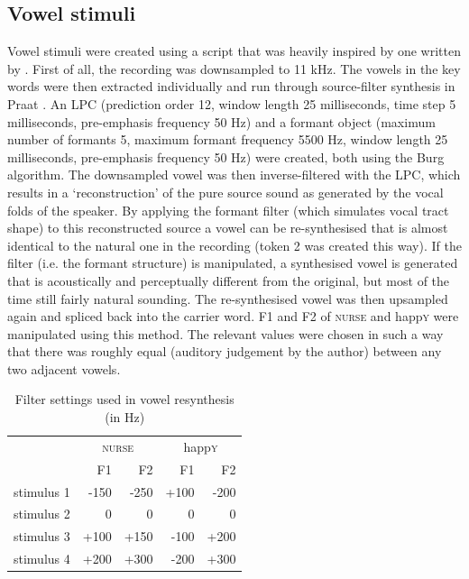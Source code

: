 \subsection{Vowel stimuli}\label{sec.perc_method.vow}

Vowel stimuli were created using a script that was heavily inspired by one written by \textcite{styler2008}.
First of all, the recording was downsampled to 11 kHz.
The vowels in the key words were then extracted individually and run through source-filter synthesis in Praat \parencite{praat}.
An LPC (prediction order 12, window length 25 milliseconds, time step 5 milliseconds, pre-emphasis frequency 50 Hz) and a formant object (maximum number of formants 5, maximum formant frequency 5500 Hz, window length 25 milliseconds, pre-emphasis frequency 50 Hz) were created, both using the Burg algorithm.
The downsampled vowel was then inverse-filtered with the LPC, which results in a `reconstruction' of the pure source sound as generated by the vocal folds of the speaker.
By applying the formant filter (which simulates vocal tract shape) to this reconstructed source a vowel can be re-synthesised that is almost identical to the natural one in the recording (token 2 was created this way).
If the filter (i.e. the formant structure) is manipulated, a synthesised vowel is generated that is acoustically and perceptually different from the original, but most of the time still fairly natural sounding.
The re-synthesised vowel was then upsampled again and spliced back into the carrier word.
F1 and F2 of \textsc{nurse} and happ\textsc{y} were manipulated using this method.
The relevant values were chosen in such a way that there was roughly equal  (auditory judgement by the author) between any two adjacent vowels.

\begin{table}[h]
	\caption{Filter settings used in vowel resynthesis (in Hz)}
	\label{tab.vowel.stimuli}
	\centering
	\begin{tabular}{lrrrr}
		\hline
		& \multicolumn{2}{c}{\textsc{nurse}} & \multicolumn{2}{c}{happ\textsc{y}}\\
		& F1 & F2 & F1 & F2\\
		\hline
		stimulus 1 & -150 & -250 & +100 & -200\\
		stimulus 2 & 0 & 0 & 0 & 0\\
		stimulus 3 & +100 & +150 & -100 & +200\\
		stimulus 4 & +200 & +300 & -200 & +300\\
		\hline
	\end{tabular}
\end{table}


